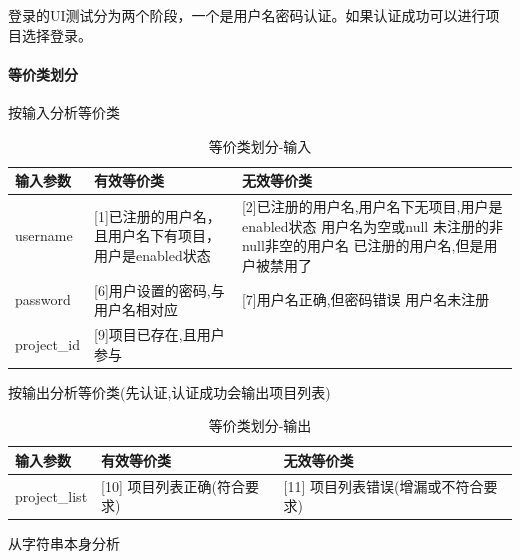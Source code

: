 \documentclass[hyperref, a4paper]{ctexart}
\let\oldparagraph\paragraph
\renewcommand{\paragraph}[1]{\oldparagraph{#1}\mbox{}}
\begin{document}
登录的UI测试分为两个阶段，一个是用户名密码认证。如果认证成功可以进行项目选择登录。

\hypertarget{ux7b49ux4ef7ux7c7bux5212ux5206}{%
\paragraph{等价类划分}\label{ux7b49ux4ef7ux7c7bux5212ux5206}}

按输入分析等价类

\begin{table}[!htbp]
  \caption{等价类划分-输入}
  \label{Tab:bookRWCal}
  \centering
  \begin{tabular}{|p{2.0cm}|p{4.5cm}|p{6.5cm}|}
  \hline
  \textbf{输入参数} &\textbf{有效等价类} &\textbf{无效等价类} \\
  \hline
  username    & [1]已注册的用户名，且用户名下有项目，用户是enabled状态 &  [2]已注册的用户名,用户名下无项目,用户是enabled状态 \newline[3]用户名为空或null   \newline[4]未注册的非null非空的用户名  \newline[5]已注册的用户名,但是用户被禁用了 \\
  \hline
 password    & [6]用户设置的密码,与用户名相对应               & [7]用户名正确,但密码错误    \newline[8]用户名未注册    \\
  \hline
 project\_id    &  [9]项目已存在,且用户参与                    & ~                                                                                          \\
  \hline
  \end{tabular}
\end{table}

按输出分析等价类(先认证,认证成功会输出项目列表)

\begin{table}[!htbp]
  \caption{等价类划分-输出}
  \label{Tab:bookRWCal}
  \centering
  \begin{tabular}{|p{2.0cm}|p{5.5cm}|p{6.5cm}|}
  \hline
  \textbf{输入参数} &\textbf{有效等价类} &\textbf{无效等价类} \\
  \hline
  project\_list    & [10] 项目列表正确(符合要求)    &  [11] 项目列表错误(增漏或不符合要求) \\                                                                       
  \hline
  \end{tabular}
\end{table}

从字符串本身分析
\end{document}
